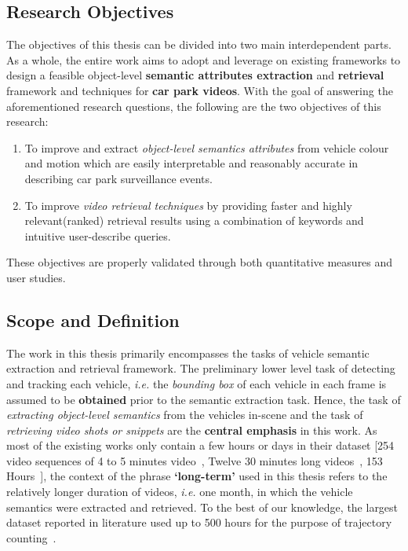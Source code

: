 \vspace{1em}
\subsection{Research Objectives}
The objectives of this thesis can be divided into two main interdependent
parts. As a whole, the entire work aims to adopt and leverage on existing
frameworks to design a feasible object-level \textbf{semantic attributes extraction} and \textbf{retrieval} framework and techniques for \textbf{car park videos}.
With the goal of answering the aforementioned research questions, the following are the two objectives of this research:

\begin{enumerate}[start=1,label={(\bfseries O\arabic*):}]
  \item To improve and extract \textit{object-level semantics attributes} from
    vehicle colour and motion which are easily interpretable and reasonably
    accurate in describing car park surveillance events.
  \item To improve \textit{video retrieval techniques} by providing faster and highly
    relevant(ranked) retrieval results using a combination of keywords and
    intuitive user-describe queries.
\end{enumerate}
\noindent These objectives are properly validated through both quantitative measures and user studies.

\vspace{1em}
\subsection{Scope and Definition}
\label{subsec:scope}
The work in this thesis primarily encompasses the tasks
of vehicle semantic extraction and retrieval framework.
The preliminary lower level task of detecting and tracking each vehicle, \emph{i.e.} the \textit{bounding box} of each vehicle in each frame is assumed to be \textbf{obtained} prior to the semantic extraction task.
Hence, the task of \textit{extracting object-level semantics} from the vehicles in-scene and the task of \textit{retrieving video shots or snippets} are the \textbf{central emphasis} in this work.
As most of the existing works only contain a few hours or days in their dataset [254 video sequences of 4 to 5 minutes video~\cite{liu2016highway}, Twelve 30 minutes long videos~\cite{marmol2016quickspot}, 153 Hours~\cite{ren2018learning}], the context of the phrase \textbf{`long-term'} used in this thesis refers to the relatively longer duration of videos, \emph{i.e.} one month, in which the vehicle semantics were extracted and retrieved. To the best of our knowledge, the largest dataset reported in literature used up to 500 hours for the purpose of trajectory counting~\cite{lessard2016countingapp}.


